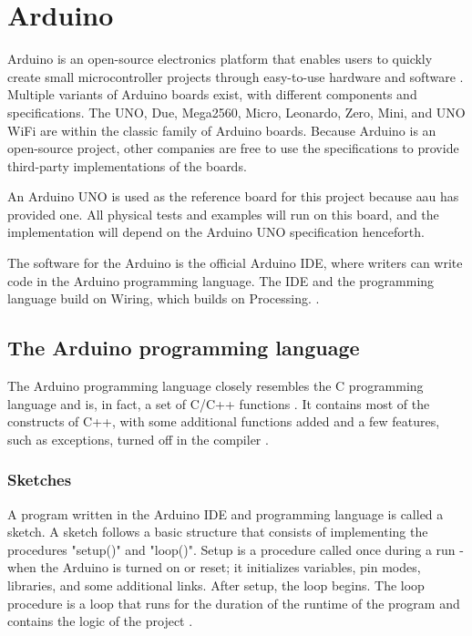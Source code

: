 \section{Arduino}\label{sec:arduino}
Arduino is an open-source electronics platform that enables users to quickly create small microcontroller projects through easy-to-use hardware and software \cite{WhatArduino}. Multiple variants of Arduino boards exist, with different components and specifications. The UNO, Due, Mega2560, Micro, Leonardo, Zero, Mini, and UNO WiFi are within the classic family of Arduino boards. Because Arduino is an open-source project, other companies are free to use the specifications to provide third-party implementations of the boards.

An Arduino UNO is used as the reference board for this project because \gls{aau} has provided one. All physical tests and examples will run on this board, and the implementation will depend on the Arduino UNO specification henceforth.

The software for the Arduino is the official Arduino IDE, where writers can write code in the Arduino programming language. The IDE and the programming language build on Wiring, which builds on Processing. \cite{WhatArduino,WiringOrg}.

\subsection{The Arduino programming language}\label{subsec:arduinoprogramminglanguage}
The Arduino programming language closely resembles the C programming language and is, in fact, a set of C/C++ functions \cite{ArduinoSupportC}. It contains most of the constructs of C++, with some additional functions added and a few features, such as exceptions, turned off in the compiler \cite{Nongnuorg}.

\subsubsection{Sketches}
A program written in the Arduino IDE and programming language is called a sketch. A sketch follows a basic structure that consists of implementing the procedures "setup()" and "loop()". Setup is a procedure called once during a run - when the Arduino is turned on or reset; it initializes variables, pin modes, libraries, and some additional links. After setup, the loop begins. The loop procedure is a loop that runs for the duration of the runtime of the program and contains the logic of the project \cite{ArduinoLanguage}.

